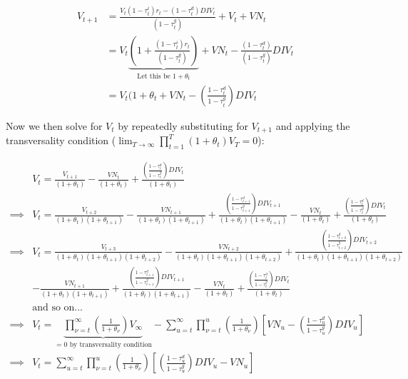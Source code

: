 \begin{equation}
\label{eqn:v_t1}
\begin{split}
V_{t+1}&=\frac{V_{t}(1-\tau^{i}_{t})r_{t}-(1-\tau^{d}_{t})DIV_{t}}{(1-\tau^{g}_{t})}+V_{t}+VN_{t} \\
 & = V_{t}\underbrace{\left(1+\frac{(1-\tau^{i}_{t})r_{t}}{(1-\tau^{g}_{t})}\right)}_{\text{Let this be }1+\theta_{t}} + VN_{t} - \frac{(1-\tau^{d}_{t})}{(1-\tau^{g}_{t})}DIV_{t} \\
 & = V_{t}(1+\theta_{t} + VN_{t} - \left(\frac{1-\tau^{d}_{t}}{1-\tau^{g}_{t}}\right)DIV_{t}
\end{split}
\end{equation}

\noindent\noindent Now we then solve for $V_{t}$ by repeatedly substituting for $V_{t+1}$ and applying the transversality condition ($\lim_{T \to \infty} \prod_{t=1}^{T}(1+\theta_{t})V_{T}=0$):

\begin{equation}
\label{eqn:solve_vs}
\begin{split}
& V_{t}=\frac{V_{t+1}}{(1+\theta_{t})} - \frac{VN_{t}}{(1+\theta_{t})}  + \frac{\left(\frac{1-\tau^{d}_{t}}{1-\tau^{g}_{t}}\right)DIV_{t}}{(1+\theta_{t})} \\
\implies &  V_{t}=\frac{V_{t+2}}{(1+\theta_{t})(1+\theta_{t+1})} - \frac{VN_{t+1}}{(1+\theta_{t})(1+\theta_{t+1})}  + \frac{\left(\frac{1-\tau^{d}_{t+1}}{1-\tau^{g}_{t+1}}\right)DIV_{t+1}}{(1+\theta_{t})(1+\theta_{t+1})} - \frac{VN_{t}}{(1+\theta_{t})}  + \frac{\left(\frac{1-\tau^{d}_{t}}{1-\tau^{g}_{t}}\right)DIV_{t}}{(1+\theta_{t})} \\
\implies &  V_{t}= \frac{V_{t+3}}{(1+\theta_{t})(1+\theta_{t+1})(1+\theta_{t+2})} - \frac{VN_{t+2}}{(1+\theta_{t})(1+\theta_{t+1})(1+\theta_{t+2})}  + \frac{\left(\frac{1-\tau^{d}_{t+2}}{1-\tau^{g}_{t+2}}\right)DIV_{t+2}}{(1+\theta_{t})(1+\theta_{t+1})(1+\theta_{t+2})} \\
& - \frac{VN_{t+1}}{(1+\theta_{t})(1+\theta_{t+1})}  + \frac{\left(\frac{1-\tau^{d}_{t+1}}{1-\tau^{g}_{t+1}}\right)DIV_{t+1}}{(1+\theta_{t})(1+\theta_{t+1})} - \frac{VN_{t}}{(1+\theta_{t})}  + \frac{\left(\frac{1-\tau^{d}_{t}}{1-\tau^{g}_{t}}\right)DIV_{t}}{(1+\theta_{t})} \\
& \text{and so on...} \\
\implies & V_{t}=\underbrace{\prod_{\nu=t}^{\infty}\left(\frac{1}{1+\theta_{\nu}}\right)V_{\infty}}_{=0 \text{ by transversality condition}} - \sum_{u=t}^{\infty} \prod_{\nu=t}^{u}\left(\frac{1}{1+\theta_{\nu}}\right)\left[VN_{u} - \left(\frac{1-\tau^{d}_{u}}{1-\tau^{g}_{u}}\right)DIV_{u}\right]\\
\implies & V_{t}= \sum_{u=t}^{\infty} \prod_{\nu=t}^{u}\left(\frac{1}{1+\theta_{\nu}}\right)\left[ \left(\frac{1-\tau^{d}_{u}}{1-\tau^{g}_{u}}\right)DIV_{u}-VN_{u}\right]\\
\end{split}
\end{equation}


